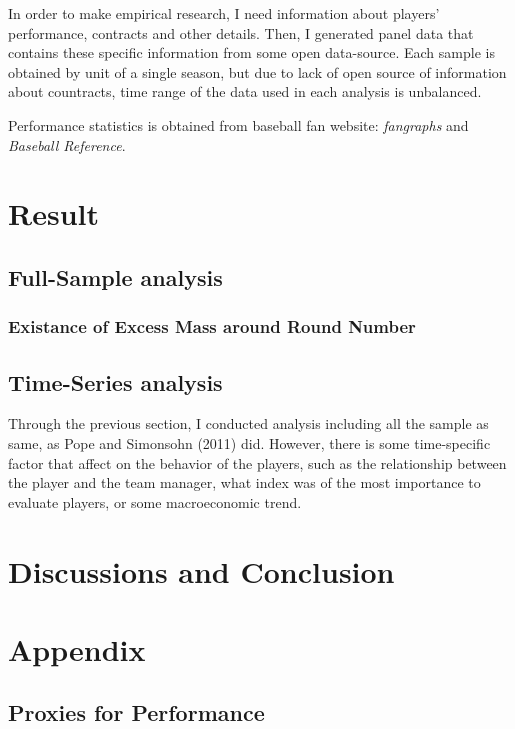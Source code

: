 \documentclass[dvipdfmx]{article}
\begin{document}
 In order to make empirical research, I need information
 about players' performance, contracts and other details.
 Then, I generated panel data that contains these specific information
 from some open data-source. Each sample is obtained by unit of a
 single season, but due to lack of open source of information about countracts,
 time range of the data used in each analysis is unbalanced.

 Performance statistics is obtained from baseball fan website:
 \textit{fangraphs} and \textit{Baseball Reference}.





\section{Result}

 \subsection{Full-Sample analysis}
  \subsubsection{Existance of Excess Mass around Round Number}



 \subsection{Time-Series analysis}


Through the previous section, I conducted analysis including
all the sample as same, as Pope and Simonsohn (2011) did.
However, there is some time-specific factor that affect on
the behavior of the players, such as the relationship
between the player and the team manager, what index
was of the most importance to evaluate players, or some
macroeconomic trend.


\section{Discussions and Conclusion}



\section{Appendix}

\subsection{Proxies for Performance}
\end{document}
